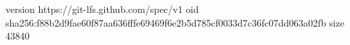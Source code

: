 version https://git-lfs.github.com/spec/v1
oid sha256:f88b2d9fae60f87aa636fffe69469f6e2b5d785cf0033d7c36fc07dd063a02fb
size 43840
